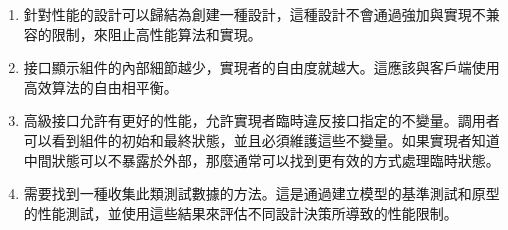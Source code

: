 \begin{enumerate}
\item 
針對性能的設計可以歸結為創建一種設計，這種設計不會通過強加與實現不兼容的限制，來阻止高性能算法和實現。

\item 
接口顯示組件的內部細節越少，實現者的自由度就越大。這應該與客戶端使用高效算法的自由相平衡。

\item 
高級接口允許有更好的性能，允許實現者臨時違反接口指定的不變量。調用者可以看到組件的初始和最終狀態，並且必須維護這些不變量。如果實現者知道中間狀態可以不暴露於外部，那麼通常可以找到更有效的方式處理臨時狀態。

\item
需要找到一種收集此類測試數據的方法。這是通過建立模型的基準測試和原型的性能測試，並使用這些結果來評估不同設計決策所導致的性能限制。

\end{enumerate}